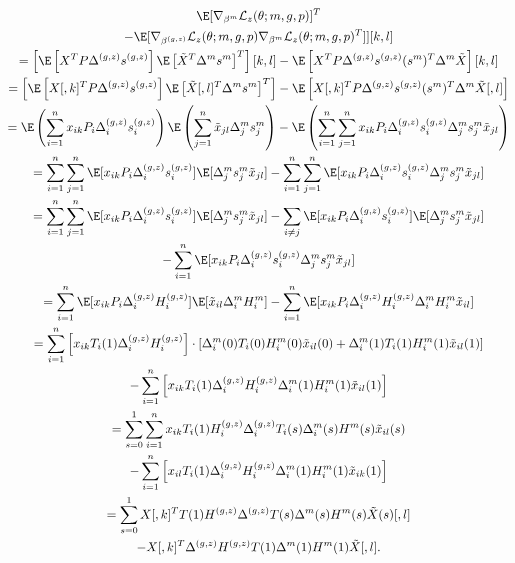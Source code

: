 \documentclass[12pt]{article}
\begin{document}
\begin{multline*}
[\E[\nabla_{\beta^{(g,z)}}\mathcal{L}_z(\theta; m, g, p) ] \E [\nabla_{\beta^m} \mathcal{L}_z(\theta; m, g, p) ]^T \\ - \E [\nabla_{\beta^{(g,z)}} \mathcal{L}_z(\theta; m, g, p) \nabla_{\beta^m}\mathcal{L}_z(\theta; m, g, p)^T ] ][k,l] \\ 
= \left[ \E \left[ {X}^T P \Delta^{(g,z)} s^{(g,z)} \right] \E\left[\tilde{X}^T \Delta^m s^m\right]^T\right][k,l] - \E \left[{X}^T P \Delta^{(g,z)} s^{(g,z)} (s^m)^T \Delta^m \tilde{X} \right][k,l] \\ = \left[\E\left[{X}[,k]^T P \Delta^{(g,z)} s^{(g,z)}\right]\E\left[\tilde{X}[,l]^T \Delta^m s^m\right]^T\right] - \E \left[{X}[,k]^T P \Delta^{(g,z)} s^{(g,z)} (s^m)^T \Delta^m \tilde{X}[,l] \right] \\ = \E\left(\sum_{i=1}^n x_{ik} P_i \Delta^{(g,z)}_i s^{(g,z)}_i\right) \E \left(\sum_{j=1}^n \tilde{x}_{jl} \Delta^m_j s^m_j \right) - \E \left(\sum_{i=1}^n \sum_{j=1}^n x_{ik} P_i \Delta^{(g,z)}_i s^{(g,z)}_i \Delta^m_j s^m_j \tilde{x}_{jl}  \right) \\ 
= \sum_{i=1}^n \sum_{j=1}^n \E [x_{ik} P_i \Delta^{(g,z)}_i s^{(g,z)}_i] \E[\Delta^m_js^m_j \tilde{x}_{jl}] - \sum_{i=1}^n \sum_{j=1}^n \E[x_{ik} P_i \Delta^{(g,z)}_i s^{(g,z)}_i \Delta^m_j s^m_j \tilde{x}_{jl}] \\
= \sum_{i=1}^n \sum_{j=1}^n \E [x_{ik} P_i \Delta^{(g,z)}_i s^{(g,z)}_i ] \E[\Delta^m_js^m_j \tilde{x}_{jl}] - \sum_{i \neq j} \E [x_{ik} P_i \Delta^{(g,z)}_i s^{(g,z)}_i] \E[\Delta^m_js^m_j \tilde{x}_{jl}] \\ - \sum_{i=1}^n \E[x_{ik} P_i \Delta^{(g,z)}_i s^{(g,z)}_i \Delta^m_j s^m_j \tilde{x}_{jl}] \\
= \sum_{i=1}^n \E[x_{ik} P_i \Delta_i^{(g,z)} H^{(g,z)}_i] \E[\tilde{x}_{il} \Delta^m_i H^m_i] - \sum_{i=1}^n \E[x_{ik} P_i \Delta_i^{(g,z)} H_i^{(g,z)} \Delta_i^m H_i^m \tilde{x}_{il}] \\ 
= \sum_{i=1}^n \left[x_{ik} T_i(1) \Delta^{(g,z)}_i H^{(g,z)}_i \right] \cdot \left[{\Delta}^m_i(0) T_i(0) {H}^m_i(0) \tilde{x}_{il}(0) + {\Delta}^m_i(1) T_i(1) {H}^m_i(1) \tilde{x}_{il}(1)\right]
\\ - \sum_{i=1}^n \left[x_{ik} T_i(1) \Delta^{(g,z)}_i H^{(g,z)}_i \Delta^m_i(1) H^m_i(1) \tilde{x}_{il}(1)\right] 
\\ = \sum_{s=0}^1 \sum_{i=1}^n x_{ik} T_i(1) H_i^{(g,z)} \Delta_i^{(g,z)} T_i(s) \Delta_i^m(s) H^m(s) \tilde{x}_{il}(s) \\ - \sum_{i=1}^n \left[x_{il}T_i(1) \Delta^{(g,z)}_i H^{(g,z)}_i \Delta^m_i(1) H^m_i(1) \tilde{x}_{ik}(1)\right] \\ = \sum_{s=0}^1 X[,k]^T T(1) H^{(g,z)} \Delta^{(g,z)} T(s)\Delta^m(s)H^m(s) \tilde{X}(s)[,l] \\ - X[,k]^T \Delta^{(g,z)} H^{(g,z)} T(1)\Delta^m(1) H^m(1) \tilde{X}[,l].
\end{multline*}
\end{document}
